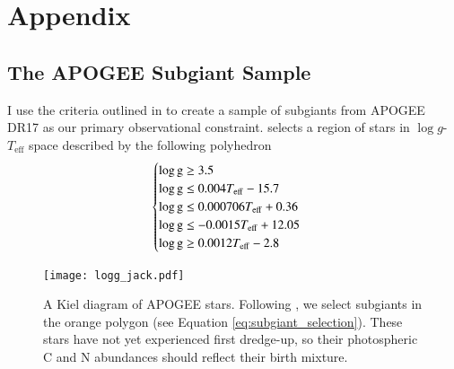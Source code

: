 \documentclass[12pt,oneside]{report}
\begin{document}



\appendix
\chapter*{Appendix}
\renewcommand{\thesection}{A.\arabic{section}}
\renewcommand\thefigure{A\arabic{figure}}    
\renewcommand\theequation{A\arabic{equation}}    
\setcounter{figure}{0}
\setcounter{equation}{0}



\section{The APOGEE Subgiant Sample}\label{sec:jack}

I use the criteria outlined in \cite{jack_subgiant} to create a sample of subgiants from APOGEE DR17 \cite{apogee17} as our primary observational constraint. 
\cite{jack_subgiant} selects a region of stars in $\log g$-$T_\text{eff}$ space described by the following polyhedron
\begin{equation}
    \begin{cases} \label{eq:subgiant_selection}
        \log \text{g} \geq 3.5 \\
        \log \text{g} \leq 0.004T_{\rm eff} - 15.7 \\
        \log \text{g} \leq 0.000706T_{\rm eff} + 0.36 \\
        \log \text{g} \leq -0.0015T_{\rm eff} + 12.05 \\
        \log \text{g} \geq 0.0012T_{\rm eff} - 2.8 \\
    \end{cases}
\end{equation}

\begin{figure}
    \centering
    \texttt{[image: logg\_jack.pdf]}
    \caption[Subgiant selection]{
        A Kiel diagram of APOGEE stars. Following \citet{jack_subgiant}, we select subgiants in the orange polygon (see Equation \ref{eq:subgiant_selection}). These stars have not yet experienced first dredge-up, so their photospheric C and N abundances should reflect their birth mixture.
    }
\end{figure}
\end{document}
